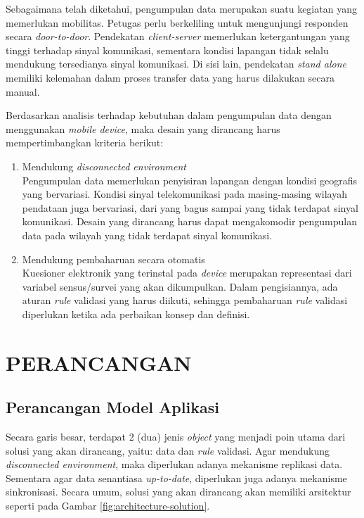 Sebagaimana telah diketahui, pengumpulan data merupakan suatu kegiatan yang memerlukan mobilitas. Petugas perlu  berkeliling untuk mengunjungi responden secara \textit{door-to-door}. Pendekatan \textit{client-server} memerlukan ketergantungan yang tinggi terhadap sinyal komunikasi, sementara kondisi lapangan tidak selalu mendukung tersedianya sinyal komunikasi. Di sisi lain, pendekatan \textit{stand alone} memiliki kelemahan dalam proses transfer data yang harus dilakukan secara manual. 


Berdasarkan analisis terhadap kebutuhan dalam pengumpulan data dengan menggunakan \textit{mobile device}, maka desain yang dirancang harus mempertimbangkan kriteria berikut:

\begin{enumerate}
\item Mendukung \textit{disconnected environment} \\
Pengumpulan data memerlukan penyisiran lapangan dengan kondisi geografis yang bervariasi. Kondisi sinyal telekomunikasi pada masing-masing wilayah pendataan juga bervariasi, dari yang bagus sampai yang tidak terdapat sinyal komunikasi. Desain yang dirancang harus dapat mengakomodir pengumpulan data pada wilayah yang tidak terdapat sinyal komunikasi.

\item Mendukung pembaharuan secara otomatis \\
Kuesioner elektronik yang terinstal pada \textit{device} merupakan representasi dari variabel sensus/survei yang akan dikumpulkan. Dalam pengisiannya, ada aturan \textit{rule} validasi yang harus diikuti, sehingga pembaharuan \textit{rule} validasi diperlukan ketika ada perbaikan konsep dan definisi.
\end{enumerate}


\section{PERANCANGAN}

\subsection{Perancangan Model Aplikasi}

Secara garis besar, terdapat 2 (dua) jenis \textit{object} yang menjadi poin utama dari solusi yang akan dirancang, yaitu: data dan \textit{rule} validasi. Agar mendukung \textit{disconnected environment}, maka diperlukan adanya mekanisme replikasi data. Sementara agar data senantiasa \textit{up-to-date}, diperlukan juga adanya mekanisme sinkronisasi. Secara umum, solusi yang akan dirancang akan memiliki arsitektur seperti pada Gambar \ref{fig:architecture-solution}.


